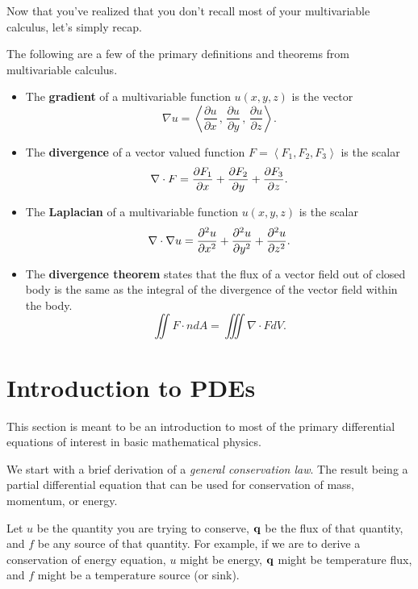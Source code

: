 Now that you've realized that you don't recall most of your multivariable calculus, let's
simply recap.
\begin{definition}
    The following are a few of the primary definitions and theorems from multivariable
    calculus.
    \begin{itemize}
        \item The {\bf gradient} of a multivariable function $u(x,y,z)$ is the vector
            \[ \nabla u = \left< \frac{\partial u}{\partial x} \, , \,
                \frac{\partial u}{\partial y} \, , \, \frac{\partial u}{\partial z}
            \right>. \]
        \item The {\bf divergence} of a vector valued function $F = \left< F_1, F_2,
            F_3\right>$ is the scalar
            \[ \nabla \cdot F = \frac{\partial{F_1}}{\partial{x}} + \frac{\partial{F_2}}{\partial{y}} + \frac{\partial{F_3}}{\partial{z}}. \]
        \item The {\bf Laplacian} of a multivariable function $u(x,y,z)$ is the scalar
            \[ \nabla \cdot \nabla u = \frac{\partial^2{u}}{\partial{x}^2} + \frac{\partial^2{u}}{\partial{y}^2} + \frac{\partial^2{u}}{\partial{z}^2}. \]
        \item The {\bf divergence theorem} states that the flux of a vector field out of closed body is the
            same as the integral of the divergence of the vector field within the body.
            \[ \iint F \cdot n dA = \iiint \nabla \cdot F dV. \]
    \end{itemize}
\end{definition}

\section{Introduction to PDEs}
This section is meant to be an introduction to most of the primary differential equations
of interest in basic mathematical physics.
    
We start with a brief derivation of a {\it general conservation law}.  The result being a
partial differential equation that can be used for conservation of mass, momentum, or
energy.

Let $u$ be the quantity you are trying to conserve, ${\bf q}$ be the flux of that quantity,
and $f$ be any source of that quantity.  For example, if we are to derive a conservation
of energy equation, $u$ might be energy, ${\bf q}$ might be temperature flux, and $f$ might be
a temperature source (or sink).

